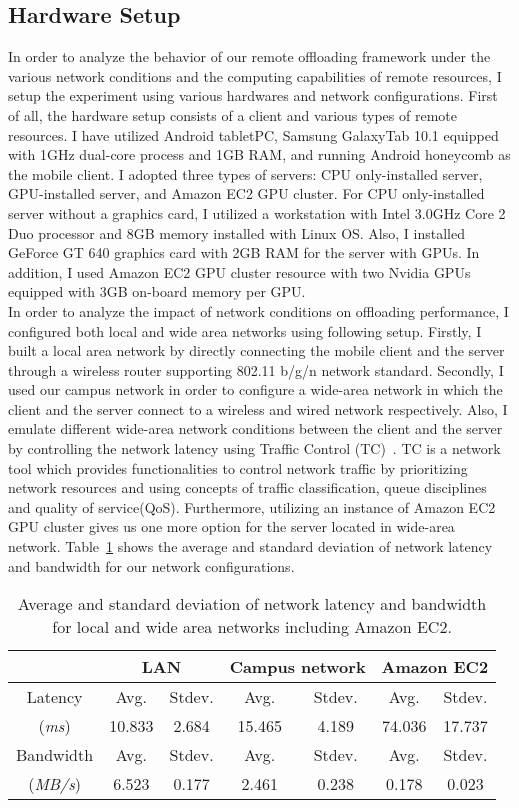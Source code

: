 \subsection{Hardware Setup}
\label{character:setup}
%
In order to analyze the behavior of our remote offloading framework
under the various network conditions and the computing capabilities of
remote resources, I setup the experiment using various hardwares and
network configurations.
%
First of all, the hardware setup consists of a client and various types of
remote resources.
%
I have utilized Android tabletPC, Samsung GalaxyTab 10.1 equipped with
1GHz dual-core process and 1GB RAM, and running Android honeycomb as the
mobile client.
%
I adopted three types of servers: CPU only-installed server,
GPU-installed server, and Amazon EC2 GPU cluster.
%
For CPU only-installed server without a graphics card, I utilized a
workstation with Intel 3.0GHz Core 2 Duo processor and 8GB memory
installed with Linux OS.
%
Also, I installed GeForce GT 640 graphics card with 2GB RAM for the
server with GPUs.
%
In addition, I used Amazon EC2 GPU cluster resource with two Nvidia
GPUs equipped with 3GB on-board memory per GPU.\\
%
In order to analyze the impact of network conditions on offloading
performance, I configured both local and wide area networks using
following setup.
%
Firstly, I built a local area network by directly connecting the mobile
client and the server through a wireless router supporting 802.11 b/g/n
network standard.
%
Secondly, I used our campus network in order to configure a wide-area
network in which the client and the server connect to a wireless and
wired network respectively.
%
Also, I emulate different wide-area network conditions between the
client and the server by controlling the network latency using Traffic
Control (TC)~\cite{tc}.
%
TC is a network tool which provides functionalities to control network
traffic by prioritizing network resources and using concepts of traffic
classification, queue disciplines and quality of service(QoS).
%
Furthermore, utilizing an instance of Amazon EC2 GPU cluster gives us
one more option for the server located in wide-area network.
%
Table~\ref{table:network_summary} shows the average and standard deviation of network latency and
bandwidth for our network configurations.
%
\begin{table}
\centering
\caption{Average and standard deviation of network latency and bandwidth
for local and wide area networks including Amazon EC2.}
	\begin{tabular}{c|cc|cc|cc}
	\hline
	\ & \multicolumn{2}{c|}{LAN} & \multicolumn{2}{c|}{Campus network} &
\multicolumn{2}{c}{Amazon EC2} \\
	\hline
	Latency & Avg. & Stdev. & Avg. & Stdev. & Avg. & Stdev.\\
	(\textit{ms}) & 10.833 & 2.684 & 15.465 & 4.189 & 74.036 & 17.737 \\ 
	Bandwidth & Avg. & Stdev. & Avg. & Stdev. & Avg. & Stdev. \\
    (\textit{MB/s}) & 6.523 & 0.177 & 2.461 & 0.238 & 0.178 & 0.023 \\ \hline
	\end{tabular}
\label{table:network_summary}
\end{table}
%
